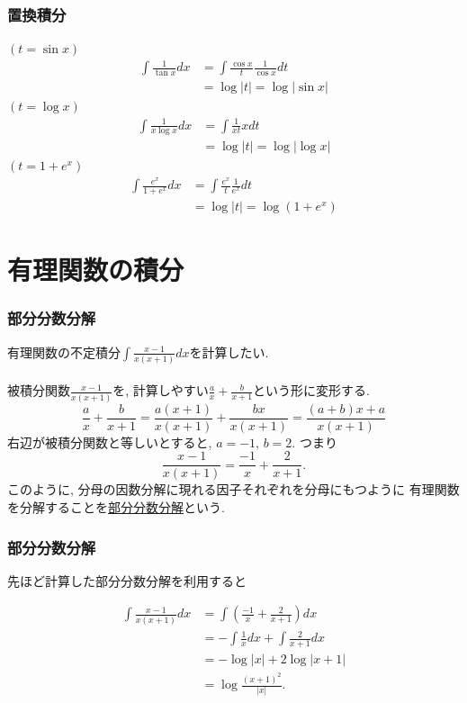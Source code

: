 \documentclass[dvipdfmx,cjk,10.2pt]{beamer}
\theoremstyle{definition}
\begin{document}
\begin{frame}
\frametitle{置換積分}

$(t=\sin x)$
\begin{align*}
\int \frac{1}{\tan x} dx & = \int \frac{\cos x}{t}\frac{1}{\cos x} dt \\
& = \log|t| = \log|\sin x|
\end{align*}
$(t=\log x)$
\begin{align*}
\int \frac{1}{x \log x}dx & = \int \frac{1}{x t} xdt \\
& = \log|t| = \log|\log x|
\end{align*}
$(t=1+e^x)$
\begin{align*}
\int \frac{e^x}{1+e^x} dx & = \int \frac{e^x}{t} \frac{1}{e^x}dt \\
& = \log|t| = \log(1+e^x)
\end{align*}

\end{frame}






\section{有理関数の積分}

\begin{frame}
\frametitle{部分分数分解}

有理関数の不定積分$\int \frac{x-1}{x(x+1)}dx$を計算したい. \\
\ \\

被積分関数$\frac{x-1}{x(x+1)}$を, 計算しやすい$\frac{a}{x}+\frac{b}{x+1}$という形に変形する. 
$$
\frac{a}{x}+\frac{b}{x+1}=
\frac{a(x+1)}{x(x+1)}+\frac{bx}{x(x+1)}=
\frac{(a+b)x+a}{x(x+1)}
$$
右辺が被積分関数と等しいとすると, $a=-1$, $b=2$. 
つまり
$$
\frac{x-1}{x(x+1)} = \frac{-1}{x}+\frac{2}{x+1}. 
$$
このように, 分母の因数分解に現れる因子それぞれを分母にもつように
有理関数を分解することを\underline{部分分数分解}という. 
\end{frame}





\begin{frame}
\frametitle{部分分数分解}

先ほど計算した部分分数分解を利用すると

\begin{align*}
\int \frac{x-1}{x(x+1)}dx & = \int ( \frac{-1}{x}+\frac{2}{x+1})dx \\
& = -\int \frac{1}{x}dx + \int \frac{2}{x+1} dx \\
& = -\log|x| + 2 \log |x+1| \\
& = \log \frac{(x+1)^2}{|x|}.  
\end{align*}

\end{frame}
\end{document}
